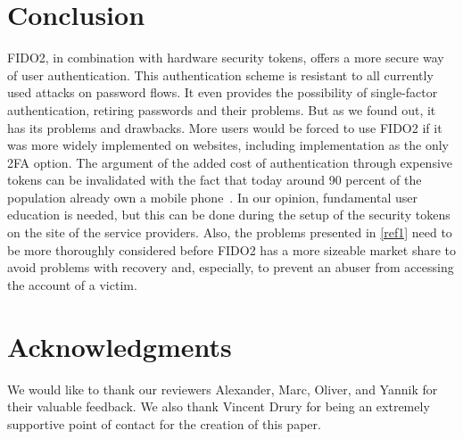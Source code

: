 \documentclass[runningheads]{llncs}
\begin{document}
\section{Conclusion}
FIDO2, in combination with hardware security tokens, offers a more secure way of user authentication. This authentication scheme is resistant to all currently used attacks on password flows. It even provides the possibility of single-factor authentication, retiring passwords and their problems. But as we found out, it has its problems and drawbacks. More users would be forced to use FIDO2 if it was more widely implemented on websites, including implementation as the only 2FA option. The argument of the added cost of authentication through expensive tokens can be invalidated with the fact that today around 90 percent of the population already own a mobile phone~\cite{000005}. In our opinion, fundamental user education is needed, but this can be done during the setup of the security tokens on the site of the service providers. Also, the problems presented in \ref{ref1} need to be more thoroughly considered before FIDO2 has a more sizeable market share to avoid problems with recovery and, especially, to prevent an abuser from accessing the account of a victim.

\section*{Acknowledgments}
We would like to thank our reviewers Alexander, Marc, Oliver, and Yannik for their valuable feedback. We also thank Vincent Drury for being an extremely
supportive point of contact for the creation of this paper.



\end{document}

